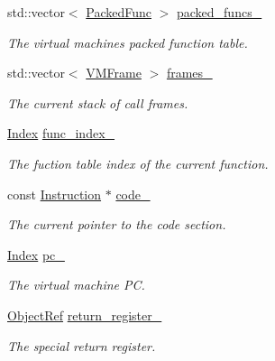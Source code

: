 \begin{DoxyCompactItemize}
\item 
std\+::vector$<$ \hyperlink{classtvm_1_1runtime_1_1PackedFunc}{Packed\+Func} $>$ \hyperlink{classtvm_1_1runtime_1_1vm_1_1VirtualMachine_ae2e5377a5dbf7335ed8989512457a2f5}{packed\+\_\+funcs\+\_\+}
\begin{DoxyCompactList}\small\item\em The virtual machine\textquotesingle{}s packed function table. \end{DoxyCompactList}\item 
std\+::vector$<$ \hyperlink{structtvm_1_1runtime_1_1vm_1_1VMFrame}{V\+M\+Frame} $>$ \hyperlink{classtvm_1_1runtime_1_1vm_1_1VirtualMachine_a4a268dec17fdd0942fe7dce78974783f}{frames\+\_\+}
\begin{DoxyCompactList}\small\item\em The current stack of call frames. \end{DoxyCompactList}\item 
\hyperlink{namespacetvm_1_1runtime_1_1vm_a3597867d2db714bf760876a23d6b7d3d}{Index} \hyperlink{classtvm_1_1runtime_1_1vm_1_1VirtualMachine_af9d51023b5d6451dac20d1a146ce5d38}{func\+\_\+index\+\_\+}
\begin{DoxyCompactList}\small\item\em The fuction table index of the current function. \end{DoxyCompactList}\item 
const \hyperlink{structtvm_1_1runtime_1_1vm_1_1Instruction}{Instruction} $\ast$ \hyperlink{classtvm_1_1runtime_1_1vm_1_1VirtualMachine_ab220bfa34c9abb2935c3b622d9bc03b2}{code\+\_\+}
\begin{DoxyCompactList}\small\item\em The current pointer to the code section. \end{DoxyCompactList}\item 
\hyperlink{namespacetvm_1_1runtime_1_1vm_a3597867d2db714bf760876a23d6b7d3d}{Index} \hyperlink{classtvm_1_1runtime_1_1vm_1_1VirtualMachine_a583f4afb3292882df571a4fdf3cbf947}{pc\+\_\+}
\begin{DoxyCompactList}\small\item\em The virtual machine PC. \end{DoxyCompactList}\item 
\hyperlink{classtvm_1_1runtime_1_1ObjectRef}{Object\+Ref} \hyperlink{classtvm_1_1runtime_1_1vm_1_1VirtualMachine_afd0505002da7e7f86f82b2f3325ff127}{return\+\_\+register\+\_\+}
\begin{DoxyCompactList}\small\item\em The special return register. \end{DoxyCompactList}\item 

\end{DoxyCompactItemize}
